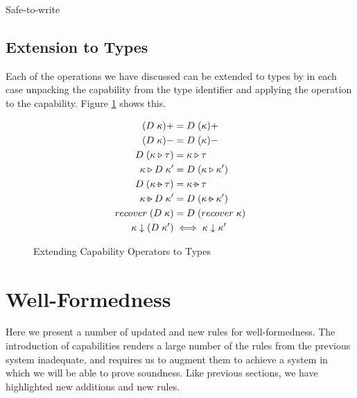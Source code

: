 \begin{table}[H]
    \centering
    
    \caption{Safe-to-write}
    \label{tab:degen-stw}
\end{table}

\subsection{Extension to Types}

Each of the operations we have discussed can be extended to types by in each case unpacking the capability from the type identifier and applying the operation to the capability. Figure \ref{fig:degen-unpack} shows this.

\begin{figure}[H]
    \centering
    \begin{align*}
        (D \; \kappa)+ &=  D \; (\kappa)+ \\
        (D \; \kappa)- &= D \; (\kappa)- \\
        D \; (\kappa \triangleright \tau) &= \kappa \triangleright \tau \\
        \kappa \triangleright D \; \kappa' &= D \; (\kappa \triangleright \kappa') \\
         D \; (\kappa \extract \tau) &= \kappa \extract \tau \\
        \kappa \extract D \; \kappa' &= D \; (\kappa \extract \kappa') \\
        recover \; (D \; \kappa) &= D \; (recover \; \kappa) \\
        \kappa \downarrow (D \; \kappa') &\iff \kappa \downarrow \kappa'
    \end{align*}
    \caption{Extending Capability Operators to Types}
    \label{fig:degen-unpack}
\end{figure}

\newpage

\section{Well-Formedness}

Here we present a number of updated and new rules for well-formedness. The introduction of capabilities renders a large number of the rules from the previous system inadequate, and requires us to augment them to achieve a system in which we will be able to prove soundness. Like previous sections, we have highlighted new additions and new rules. \\

